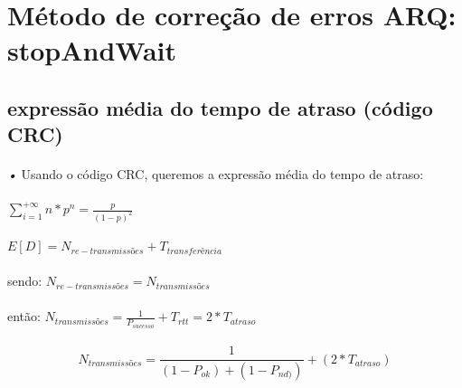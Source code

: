 \documentclass[13pt,a4paper]{report}
\begin{document}
\paragraph{}
\section{Método de correção de erros ARQ: stopAndWait}

\subsection{expressão média do tempo de atraso (código CRC)}

\paragraph{}
\emph{•} Usando o código CRC, queremos a expressão média do tempo de atraso:

\paragraph{}
$\sum\limits_{i=1}^{+\infty} n * p^n = \frac{p}{(1 - p)^2}$

\paragraph{}
$E[D] = N_{re-transmissões} + T_{transferência}$


\paragraph{}
sendo:
$N_{re-transmissões} = N_{transmissões}$


\paragraph{}
então:
$N_{transmissões} = \frac{1}{P_{sucesso}} + T_{rtt} = 2 * T_{atraso}$

\paragraph{}
\begin{Large}
\begin{equation}
N_{transmissões} = \frac{1}{(1 - P_{ok}) + (1 - P_{nd)})} + (2 * T_{atraso})
\end{equation}
\end{Large}	


\end{document}
